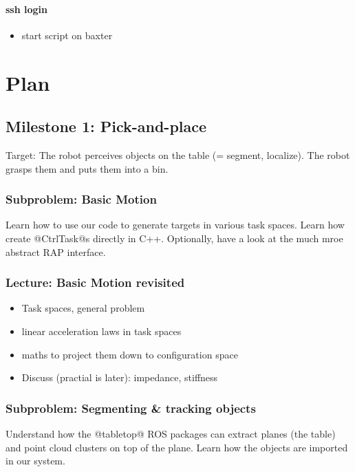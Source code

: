 \documentclass[10pt,fleqn,twoside]{article}
\begin{document}
\paragraph{ssh login}
\begin{itemize}
\item start script on baxter
\end{itemize}

\section{Plan}

\subsection{Milestone 1: Pick-and-place}

Target: The robot perceives objects on the table (= segment,
localize). The robot grasps them and puts them into a bin.

\subsubsection{Subproblem: Basic Motion}

Learn how to use our code to generate targets in various task
spaces. Learn how create @CtrlTask@s directly in C++. Optionally, have
a look at the much mroe abstract RAP interface.

\subsubsection{Lecture: Basic Motion revisited}
\begin{itemize}
\item Task spaces, general problem
\item linear acceleration laws in task spaces
\item maths to project them down to configuration space
\item Discuss (practial is later): impedance, stiffness
\end{itemize}

\subsubsection{Subproblem: Segmenting \& tracking objects}

Understand how the @tabletop@ ROS packages can extract planes (the
table) and point cloud clusters on top of the plane. Learn how the
objects are imported in our system.
\end{document}
